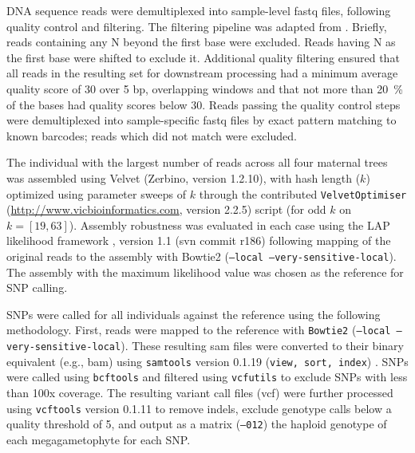 \documentclass[smallextended]{svjour3}
\begin{document}
DNA sequence reads were demultiplexed into sample-level fastq files, following
quality control and filtering.  The filtering pipeline was adapted from
\citet{Friedline:2012fm}. Briefly, reads containing any N beyond the
first base were excluded. Reads having N as the first base were shifted to
exclude it.  Additional quality filtering ensured that all reads in the
resulting set for downstream processing had a minimum average quality score of
30 over 5 bp, overlapping windows and that not more than \SI{20}{\percent} of
the bases had quality scores below 30. Reads passing the quality control steps
were demultiplexed into sample-specific fastq files by exact pattern matching to
known barcodes; reads which did not match were excluded.

The individual with the largest number of reads across all four maternal trees
was assembled using Velvet (Zerbino, version 1.2.10), with hash length ($k$)
optimized using parameter sweeps of $k$ through the contributed
\texttt{VelvetOptimiser} (\url{http://www.vicbioinformatics.com}, version 2.2.5)
script (for odd $k$ on $k=[19,63]$).  Assembly robustness was evaluated in each
case using the LAP likelihood framework \citep{Ghodsi:2013bc}, version 1.1 (svn
commit r186) following mapping of the original reads to the assembly with
Bowtie2 \citep{Langmead:2012jh} (\texttt{--local --very-sensitive-local}).  The
assembly with the maximum likelihood value was chosen as the reference for SNP
calling.

SNPs were called for all individuals against the reference using the following
methodology.  First, reads were mapped to the reference with \texttt{Bowtie2}
(\texttt{--local --very-sensitive-local}).  These resulting sam files were
converted to their binary equivalent (e.g., bam) using \texttt{samtools} version
0.1.19 (\texttt{view, sort, index}) \citep{Li:2009ka}.  SNPs were called using
\texttt{bcftools} and filtered using \texttt{vcfutils} to exclude SNPs with less
than 100x coverage. The resulting variant call files (vcf) were further
processed using \texttt{vcftools} version 0.1.11 \citep{Danecek:2011gz} to
remove indels, exclude genotype calls below a quality threshold of 5, and output
as a matrix (\texttt{--012}) the haploid genotype of each megagametophyte for
each SNP.
\end{document}
